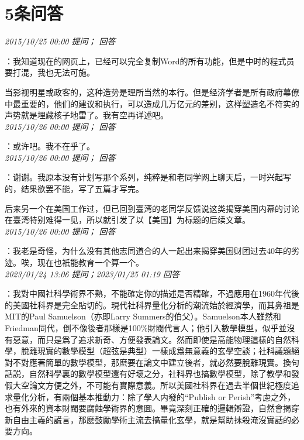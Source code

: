 \documentclass[twocolumn]{ctexart}
\begin{document}
\section{5条问答}

\textit{\hfill\noindent\small 2015/10/25 00:00 提问； 回答}

：我知道现在的网页上，已经可以完全复制Word的所有功能，但是中时的程式员要打混，我也无法可施。

当影视明星或政客的，这种造势是理所当然的本行。但是经济学者是所有政府幕僚中最重要的，他们的建议和执行，可以造成几万亿元的差别，这样塑造名不符实的声势就是埋藏核子地雷了。我有空再详述吧。\\

\textit{\hfill\noindent\small 2015/10/26 00:00 提问； 回答}

：或许吧。我不在乎了。\\

\textit{\hfill\noindent\small 2015/10/26 00:00 提问； 回答}

：谢谢。我原本没有计划写那个系列，纯粹是和老同学网上聊天后，一时兴起写的，结果欲罢不能，写了五篇才写完。

后来另一个在美国工作过，但已回到臺湾的老同学反馈说这类揭穿美国内幕的讨论在臺湾特别难得一见，所以就引发了以【美国】为标题的后续文章。\\

\textit{\hfill\noindent\small 2015/10/26 00:00 提问； 回答}

：我老是奇怪，为什么没有其他志同道合的人一起出来揭穿美国财团过去40年的劣迹。唉，现在也衹能教育一个算一个。\\

\textit{\hfill\noindent\small 2023/01/24 13:06 提问；2023/01/25 01:19 回答}

：我對中國社科學術界不熟，不能確定你的描述是否精確，不過應用在1960年代後的美國社科界是完全貼切的。現代社科界量化分析的潮流始於經濟學，而其鼻祖是MIT的Paul Samuelson（亦即Larry Summers的伯父）。Samuelson本人雖然和Friedman同代，倒不像後者那樣是100\%財閥代言人；他引入數學模型，似乎並沒有惡意，而只是爲了追求新奇、方便發表論文。然而即使是高能物理這樣的自然科學，脫離現實的數學模型（超弦是典型）一樣成爲無意義的玄學空談；社科議題絕對不對應著簡單的數學模型，那麽要在論文中建立後者，就必然要脫離現實。換句話説，自然科學裏的數學模型還有好壞之分，社科界也搞數學模型，除了教學和發假大空論文方便之外，不可能有實際意義。所以美國社科界在過去半個世紀極度追求量化分析，有兩個基本推動力：除了學人内發的“Publish or Perish”考慮之外，也有外來的資本財閥要腐蝕學術界的意圖。畢竟深刻正確的邏輯辯證，自然會揭穿新自由主義的謊言，那麽鼓勵學術主流去搞量化玄學，就是幫助抹殺淹沒實話的必要方向。
\end{document}
